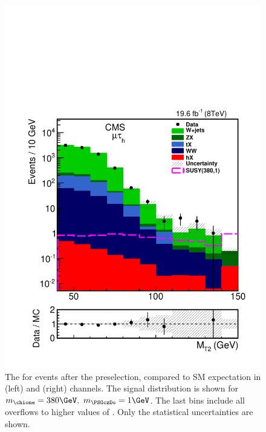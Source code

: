 \begin{figure}[!htb]
\includegraphics[angle=0,scale=0.375]{SelectionMuTau/MT2_mutau.pdf}
\caption{The \mttwo for events after the preselection, compared to SM expectation in (left) \eTau and (right) \muTau channels. The signal distribution is shown for $m_{\chione}=380\GeV,~m_{\PSGczDo}=1\GeV$. The last bins include all overflows to higher values of \mttwo. Only the statistical uncertainties are shown.}
\label{fig:mt2leptontau}
\end{figure}






